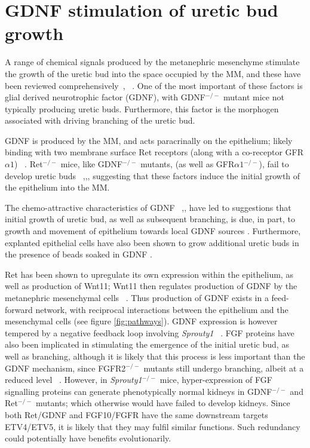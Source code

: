 \documentclass[pdftex,10pt,a4paper,twocolumn]{article}
\begin{document}
\section{GDNF stimulation of uretic bud growth} \label{sec:GDNF}
A range of chemical signals produced by the metanephric mesenchyme stimulate the growth of the uretic bud into the space occupied by the MM, and these have been reviewed comprehensively~\cite{costantini2006gdnf}, ~\cite{dressler2006cellular}. One of the most important of these factors is glial derived neurotrophic factor (GDNF), with GDNF$^{-/-}$ mutant mice not typically producing uretic buds. Furthermore, this factor is the morphogen associated with driving branching of the uretic bud.

GDNF is produced by the MM, and acts paracrinally on the epithelium; likely binding with two membrane surface Ret receptors (along with a co-receptor GFR$\alpha 1$) ~\cite{MenshykauDIber}. Ret$^{-/-}$ mice, like GDNF$^{-/-}$ mutants, (as well as GFR$\alpha 1$$^{-/-}$), fail to develop uretic buds ~\cite{CostantiniFKopan2010},\cite{majumdar2003wnt11},\cite{treanor1996characterization}, suggesting that these factors induce the initial growth of the epithelium into the MM.

The chemo-attractive characteristics of GDNF ~\cite{tang2002ureteric},\cite{tang1998ret}, have led to suggestions that initial growth of uretic bud, as well as subsequent branching, is due, in part, to growth and movement of epithelium towards local GDNF sources \cite{sariola2003novel}. Furthermore, explanted epithelial cells have also been shown to grow additional uretic buds in the presence of beads soaked in GDNF \cite{pepicelli1997gdnf}. 

Ret has been shown to upregulate its own expression within the epithelium, as well as production of Wnt11\cite{pepicelli1997gdnf}; Wnt11 then regulates production of GDNF by the metanephric mesenchymal cells ~\cite{majumdar2003wnt11}. Thus production of GDNF exists in a feed-forward network, with reciprocal interactions between the epithelium and the mesenchymal cells (see figure \ref{fig:pathways}). GDNF expression is however tempered by a negative feedback loop involving \textit{Sprouty1} ~\cite{basson2005sprouty1}. FGF proteins have also been implicated in stimulating the emergence of the initial uretic bud, as well as branching, although it is likely that this process is less important than the GDNF mechanism, since FGFR2${^{-/-}}$ mutants still undergo branching, albeit at a reduced level ~\cite{sims2009three}. However, in \textit{Sprouty1}${^{-/-}}$ mice, hyper-expression of FGF signalling proteins can generate phenotypically normal kidneys in GDNF$^{-/-}$ and Ret$^{-/-}$ mutants; which otherwise would have failed to develop kidneys. Since both Ret/GDNF and FGF10/FGFR have the same downstream targets ETV4/ETV5, it is likely that they may fulfil similar functions. Such redundancy could potentially have benefits evolutionarily.
\end{document}
